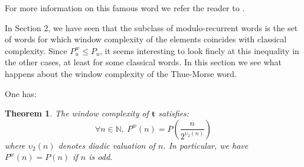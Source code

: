 \documentclass[a4 paper,12pt]{article}
\newtheorem{theorem}{Theorem}[section]
\begin{document}
For more information on this famous word we refer the reader to \cite{1,2, 4, 6}. 

In Section 2, we have seen that the subclass of modulo-recurrent words is the set of words for which window complexity of the elements coincides with  classical complexity.  Since $P^{w}_{u}\leq P_u$, it seems interesting to look  finely at this inequality in the other cases, at least for some classical words. In this section we see what happens about the window complexity of the Thue-Morse word.


One has:

 \begin{theorem} \label{TM} The window complexity of $\mathbf{t}$ satisfies:
 $$\forall n\in \mathbb{N},\ P^w(n)=P\left(\frac{n}{2^{\upsilon_2\left(n\right)}}\right)$$
 where $\upsilon_2\left(n\right)$ denotes diadic valuation of $n$. In particular, we have $ P^w(n)=P(n)$ if $n$ is odd.

 \end{theorem}
\end{document}

